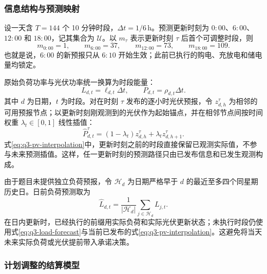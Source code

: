 \subsubsection{信息结构与预测映射}

设一天含 $T=144$ 个 10 分钟时段，$\Delta t=1/6\,\mathrm{h}$。预测更新时刻为 $0{:}00$、$6{:}00$、$12{:}00$ 和 $18{:}00$，记其集合为 $\mathcal U$。以 $m_\tau$ 表示更新时刻 $\tau$ 后首个可调整时段，则
\begin{equation}
m_{0{:}00}=1,\qquad m_{6{:}00}=37,\qquad m_{12{:}00}=73,\qquad m_{18{:}00}=109.
\label{eq:q3-first-mutable}
\end{equation}
也就是说，$6{:}00$ 的新预报只从 $6{:}10$ 开始生效；此前已执行的购电、充放电和储电量均锁定。

原始负荷功率与光伏功率统一换算为时段能量：
\begin{equation}
L_{d,t}=\ell_{d,t}\Delta t,\qquad P_{d,t}=\rho_{d,t}\Delta t.
\label{eq:q3-energy-conversion}
\end{equation}
其中 $d$ 为日期，$t$ 为时段。对在时刻 $\tau$ 发布的逐小时光伏预报，令 $z_{d,h}^{\tau}$ 为相邻的可用预报节点；以更新时刻刚观测到的光伏作为起始锚点，并在相邻节点间按时间权重 $\lambda_t\in[0,1]$ 线性插值：
\begin{equation}
\widehat P_{d,t}^{\tau}=(1-\lambda_t)z_{d,h}^{\tau}+\lambda_t z_{d,h+1}^{\tau}.
\label{eq:q3-pv-interpolation}
\end{equation}
式\eqref{eq:q3-pv-interpolation}中，更新时刻之前的时段直接保留已观测实际值，不参与未来预测插值。这样，任一更新时刻的预测路径只由已发布信息和已发生观测构成。

由于题目未提供独立负荷预报，令 $\mathcal H_d$ 为日期严格早于 $d$ 的最近至多四个同星期历史日。日前负荷预测取为
\begin{equation}
\widehat L_{d,t}=\frac{1}{|\mathcal H_d|}\sum_{j\in\mathcal H_d}L_{j,t}.
\label{eq:q3-load-forecast}
\end{equation}
在日内更新时，已经执行的前缀用实际负荷和实际光伏更新状态；未执行时段仍使用式\eqref{eq:q3-load-forecast}与当前已发布的式\eqref{eq:q3-pv-interpolation}。这避免将当天未来实际负荷或光伏提前带入承诺决策。

\subsubsection{计划调整的结算模型}

